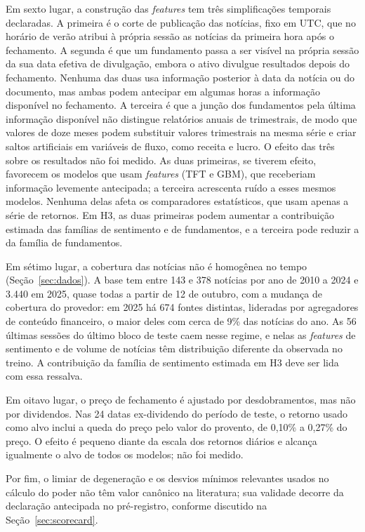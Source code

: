 Em sexto lugar, a construção das \textit{features} tem três simplificações temporais declaradas. A primeira é o corte de publicação das notícias, fixo em UTC, que no horário de verão atribui à própria sessão as notícias da primeira hora após o fechamento. A segunda é que um fundamento passa a ser visível na própria sessão da sua data efetiva de divulgação, embora o ativo divulgue resultados depois do fechamento. Nenhuma das duas usa informação posterior à data da notícia ou do documento, mas ambas podem antecipar em algumas horas a informação disponível no fechamento. A terceira é que a junção dos fundamentos pela última informação disponível não distingue relatórios anuais de trimestrais, de modo que valores de doze meses podem substituir valores trimestrais na mesma série e criar saltos artificiais em variáveis de fluxo, como receita e lucro. O efeito das três sobre os resultados não foi medido. As duas primeiras, se tiverem efeito, favorecem os modelos que usam \textit{features} (TFT e GBM), que receberiam informação levemente antecipada; a terceira acrescenta ruído a esses mesmos modelos. Nenhuma delas afeta os comparadores estatísticos, que usam apenas a série de retornos. Em H3, as duas primeiras podem aumentar a contribuição estimada das famílias de sentimento e de fundamentos, e a terceira pode reduzir a da família de fundamentos.

Em sétimo lugar, a cobertura das notícias não é homogênea no tempo (Seção~\ref{sec:dados}). A base tem entre 143 e 378 notícias por ano de 2010 a 2024 e 3.440 em 2025, quase todas a partir de 12 de outubro, com a mudança de cobertura do provedor: em 2025 há 674 fontes distintas, lideradas por agregadores de conteúdo financeiro, o maior deles com cerca de 9\% das notícias do ano. As 56 últimas sessões do último bloco de teste caem nesse regime, e nelas as \textit{features} de sentimento e de volume de notícias têm distribuição diferente da observada no treino. A contribuição da família de sentimento estimada em H3 deve ser lida com essa ressalva.

Em oitavo lugar, o preço de fechamento é ajustado por desdobramentos, mas não por dividendos. Nas 24 datas ex-dividendo do período de teste, o retorno usado como alvo inclui a queda do preço pelo valor do provento, de 0,10\% a 0,27\% do preço. O efeito é pequeno diante da escala dos retornos diários e alcança igualmente o alvo de todos os modelos; não foi medido.

Por fim, o limiar de degeneração e os desvios mínimos relevantes usados no cálculo do poder não têm valor canônico na literatura; sua validade decorre da declaração antecipada no pré-registro, conforme discutido na Seção~\ref{sec:scorecard}.

